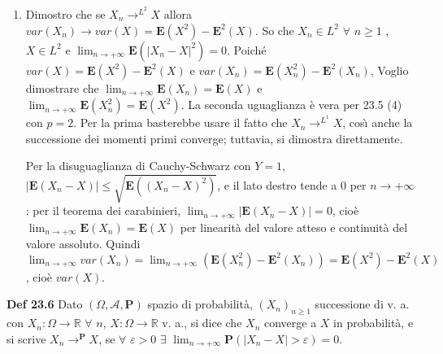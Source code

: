 \documentclass{article}
\begin{document}
\begin{enumerate}
\item Dimostro che se $X_{n}\rightarrow ^{L^{2}}X$ allora $var\left(
X_{n}\right) \rightarrow var\left( X\right) =\mathbf{E}\left( X^{2}\right) -%
\mathbf{E}^{2}\left( X\right) $. So che $X_{n}\in L^{2}$ $\forall $ $n\geq 1$%
, $X\in L^{2}$ e $\lim_{n\rightarrow +\infty }\mathbf{E}\left( \left\vert
X_{n}-X\right\vert ^{2}\right) =0$. Poich\'{e} $var\left( X\right) =\mathbf{E%
}\left( X^{2}\right) -\mathbf{E}^{2}\left( X\right) $ e $var\left(
X_{n}\right) =\mathbf{E}\left( X_{n}^{2}\right) -\mathbf{E}^{2}\left(
X_{n}\right) $, Voglio dimostrare che $\lim_{n\rightarrow +\infty }\mathbf{E}%
\left( X_{n}\right) =\mathbf{E}\left( X\right) $ e $\lim_{n\rightarrow
+\infty }\mathbf{E}\left( X_{n}^{2}\right) =\mathbf{E}\left( X^{2}\right) $.
La seconda uguaglianza \`{e} vera per 23.5 (4) con $p=2$. Per la prima
basterebbe usare il fatto che $X_{n}\rightarrow ^{L^{1}}X$, cos\`{\i} anche
la successione dei momenti primi converge; tuttavia, si dimostra
direttamente.

Per la disuguaglianza di Cauchy-Schwarz con $Y=1$, $\left\vert \mathbf{E}%
\left( X_{n}-X\right) \right\vert \leq \sqrt{\mathbf{E}\left( \left(
X_{n}-X\right) ^{2}\right) }$, e il lato destro tende a $0$ per $%
n\rightarrow +\infty $: per il teorema dei carabinieri, $\lim_{n\rightarrow
+\infty }\left\vert \mathbf{E}\left( X_{n}-X\right) \right\vert =0$, cio\`{e}
$\lim_{n\rightarrow +\infty }\mathbf{E}\left( X_{n}\right) =\mathbf{E}\left(
X\right) $ per linearit\`{a} del valore atteso e continuit\`{a} del valore
assoluto. Quindi $\lim_{n\rightarrow +\infty }var\left( X_{n}\right)
=\lim_{n\rightarrow +\infty }\left( \mathbf{E}\left( X_{n}^{2}\right) -%
\mathbf{E}^{2}\left( X_{n}\right) \right) =\mathbf{E}\left( X^{2}\right) -%
\mathbf{E}^{2}\left( X\right) $, cio\`{e} $var\left( X\right) $.
\end{enumerate}

\textbf{Def 23.6} Dato $\left( \Omega ,\mathcal{A},\mathbf{P}\right) $
spazio di probabilit\`{a}, $\left( X_{n}\right) _{n\geq 1}$ successione di
v. a. con $X_{n}:\Omega \rightarrow 
\mathbb{R}
$ $\forall $ $n$, $X:\Omega \rightarrow 
\mathbb{R}
$ v. a., si dice che $X_{n}$ converge a $X$ in probabilit\`{a}, e si scrive $%
X_{n}\rightarrow ^{\mathbf{P}}X$, se $\forall $ $\varepsilon >0$ $\exists $ $%
\lim_{n\rightarrow +\infty }\mathbf{P}\left( \left\vert X_{n}-X\right\vert
>\varepsilon \right) =0$.
\end{document}
